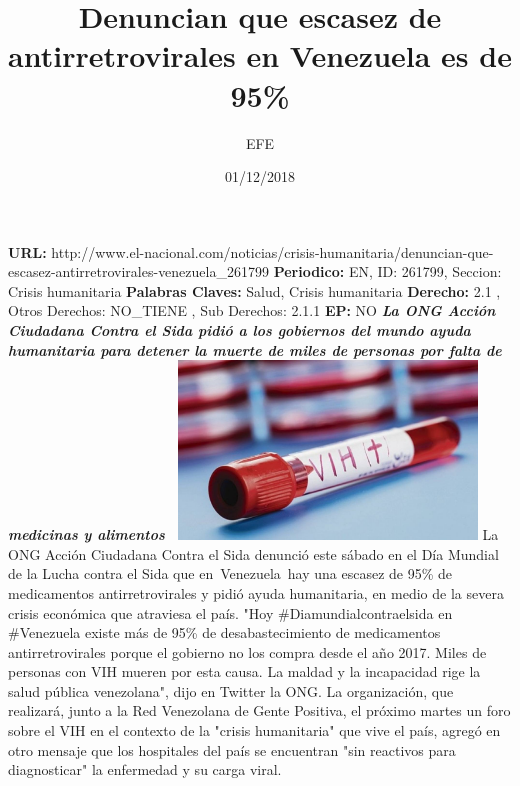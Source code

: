 \documentclass{article}%
\title{\textbf{Denuncian que escasez de antirretrovirales en Venezuela es de 95\%}}%
\author{EFE}%
\date{01/12/2018}%
\begin{document}
%
\normalsize%
\maketitle%
\textbf{URL: }%
http://www.el{-}nacional.com/noticias/crisis{-}humanitaria/denuncian{-}que{-}escasez{-}antirretrovirales{-}venezuela\_261799\newline%
%
\textbf{Periodico: }%
EN, %
ID: %
261799, %
Seccion: %
Crisis humanitaria\newline%
%
\textbf{Palabras Claves: }%
Salud, Crisis humanitaria\newline%
%
\textbf{Derecho: }%
2.1%
, Otros Derechos: %
NO\_TIENE%
, Sub Derechos: %
2.1.1%
\newline%
%
\textbf{EP: }%
NO\newline%
\newline%
%
\textbf{\textit{La ONG Acción Ciudadana Contra el Sida pidió a los gobiernos del mundo ayuda humanitaria para detener la muerte de miles de personas por falta de medicinas y alimentos~}}%
\newline%
\newline%
%
\includegraphics[width=300px]{24.jpg}%
\newline%
%
La ONG Acción Ciudadana Contra el Sida denunció este sábado en el Día Mundial de la Lucha contra el Sida que en~Venezuela~hay una escasez de 95\% de medicamentos antirretrovirales y pidió ayuda humanitaria, en medio de la severa crisis económica que atraviesa el país.%
\newline%
%
"Hoy \#Diamundialcontraelsida en \#Venezuela existe más de 95\% de desabastecimiento de medicamentos antirretrovirales porque el gobierno no los compra desde el año 2017. Miles de personas con VIH mueren por esta causa. La maldad y la incapacidad rige la salud pública venezolana", dijo en Twitter la ONG.%
\newline%
%
La organización, que realizará, junto a la Red Venezolana de Gente Positiva, el próximo martes un foro sobre el VIH en el contexto de la "crisis humanitaria" que vive el país, agregó en otro mensaje que los hospitales del país se encuentran "sin reactivos para diagnosticar" la enfermedad y su carga viral.%
\end{document}
